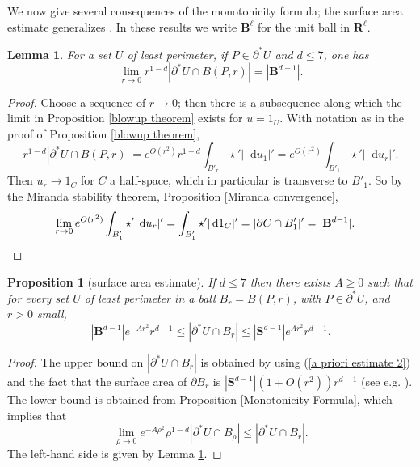 \documentclass[reqno,12pt,letterpaper]{amsart}
\newcommand{\RR}{\mathbf{R}}
\newcommand{\Sph}{\mathbf S}
\newcommand{\Ball}{\mathbf{B}}
\newcommand*\dif{\mathop{}\!\mathrm{d}}
\newtheorem{lemma}[theorem]{Lemma}
\newtheorem{proposition}[theorem]{Proposition}
\theoremstyle{definition}
\numberwithin{equation}{section}
\begin{document}
We now give several consequences of the monotonicity formula; the surface area estimate generalizes \cite[Remark 5.13]{Giusti77}.
In these results we write $\Ball^\ell$ for the unit ball in $\RR^\ell$.

\begin{lemma}\label{least perimeter minimal size}
For a set $U$ of least perimeter, if $P \in \partial^* U$ and $d \leq 7$, one has
$$\lim_{r \to 0} r^{1 - d} |\partial^* U \cap B(P, r)| = |\Ball^{d - 1}|.$$
\end{lemma}
\begin{proof}
Choose a sequence of $r \to 0$; then there is a subsequence along which the limit in Proposition \ref{blowup theorem} exists for $u = 1_U$.
With notation as in the proof of Proposition \ref{blowup theorem},
$$r^{1 - d} |\partial^* U \cap B(P, r)| = e^{O(r^2)} r^{1 - d}\int_{B'_r} \star'|\dif u_1|' = e^{O(r^2)} \int_{B'_1} \star'|\dif u_r|'.$$
Then $u_r \to 1_C$ for $C$ a half-space, which in particular is transverse to $B'_1$.
So by the Miranda stability theorem, Proposition \ref{Miranda convergence},
\begin{align*}
\lim_{r \to 0} e^{O(r^2)} \int_{B'_1} \star'|\dif u_r|' &= \int_{B'_1} \star'|\dif 1_C|' = |\partial C \cap B'_1|' = |\Ball^{d - 1}|. \qedhere 
\end{align*}
\end{proof}

\begin{proposition}[surface area estimate]\label{doubling dimension}
If $d \leq 7$ then there exists $A \geq 0$ such that for every set $U$ of least perimeter in a ball $B_r = B(P, r)$, with $P \in \partial^* U$, and $r > 0$ small,
$$|\Ball^{d - 1}|e^{-Ar^2}r^{d - 1} \leq |\partial^*U \cap B_r| \leq |\Sph^{d - 1}|e^{Ar^2} r^{d - 1}.$$
\end{proposition}
\begin{proof}
The upper bound on $|\partial^* U \cap B_r|$ is obtained by using (\ref{a priori estimate 2}) and the fact that the surface area of $\partial B_r$ is $|\Sph^{d - 1}|(1 + O(r^2))r^{d - 1}$ (see e.g. \cite{gray1974volume}).
The lower bound is obtained from Proposition \ref{Monotonicity Formula}, which implies that
$$\lim_{\rho \to 0} e^{-A\rho^2} \rho^{1 - d} |\partial^* U \cap B_\rho| \leq |\partial^* U \cap B_r|.$$
The left-hand side is given by Lemma \ref{least perimeter minimal size}.
\end{proof}
\end{document}
